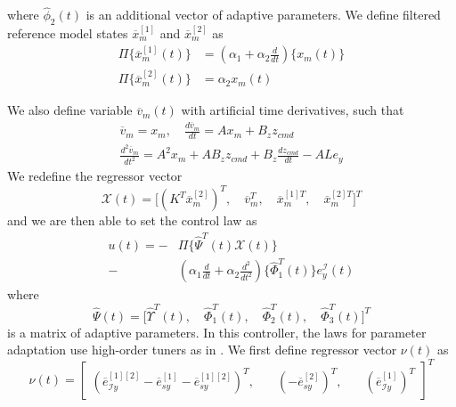 \documentclass[english]{ifacconf}
\begin{document}
where $\hat{\phi}_2(t)$ is an additional vector of adaptive parameters. We define filtered reference model states $\overline{x}_m^{[1]}$ and $\overline{x}_m^{[2]}$ as
\begin{equation}
\begin{aligned}
	\Pi \big \{  \overline{x}_{m}^{[1]} (t) \big \} &= (\alpha_1 + \alpha_2 \frac{d}{dt}) \big \{ x_m (t) \big \} \\
	\Pi \big \{  \overline{x}_{m}^{[2]}(t) \big \} &= \alpha_2 x_m (t)
\end{aligned}	
\end{equation}

We also define variable $\overline{v}_m(t)$ with artificial time derivatives, such that
\begin{equation}
\begin{gathered}
	\overline{v}_m = x_m, \quad \frac{d \overline{v}_m}{dt}  = A x_m + B_z z_{cmd} \\
	\frac{d^2 \overline{v}_m}{dt^2}  = A^2 x_m + A B_z z_{cmd} + B_z \frac{dz_{cmd}}{dt} - A L e_y
\end{gathered}
\end{equation}
We redefine the regressor vector
\begin{equation}
\mathcal{X}(t) = \big[ (K^T \overline{x}_m^{[2]})^T,\quad \overline{v}_m^T,\quad \overline{x}_m^{[1]T},\quad \overline{x}_m^{[2]T} \big]^T
\end{equation}
and we are then able to set the control law as
\begin{equation}
\begin{aligned}
	u (t) = -&\Pi \big \{ \hat{\Psi}^T(t) \mathcal{X}(t) \big \} \\ - & (\alpha_1 \frac{d}{dt} + \alpha_2 \frac{d^2}{dt^2}) \big \{ \hat{\Phi}_1^T(t) \big \} e_y^\mathcal{I} (t)
\end{aligned}
\end{equation}
where 
\begin{equation}
\hat{\Psi}(t) = \big[ \hat{\Upsilon}^T(t),\quad \hat{\Phi}_1^T(t),\quad \hat{\Phi}_2^T(t),\quad \hat{\Phi}_3^T(t) \big]^T 
\end{equation}
is a matrix of adaptive parameters. In this controller, the laws for parameter adaptation use high-order tuners as in \cite{qu2016phd}. We first define regressor vector $\nu(t)$ as
\begin{equation}
	\nu(t) = \begin{bmatrix}
		(\overline{e}_{\mathcal{I}y}^{[1][2]} - \overline{e}_{sy}^{[1]} - \overline{e}_{sy}^{[1][2]})^T, & \quad (-\overline{e}_{sy}^{[2]})^T, & \quad (\overline{e}_{\mathcal{I}y}^{[1]})^T
	\end{bmatrix}^T
\end{equation}
\end{document}
